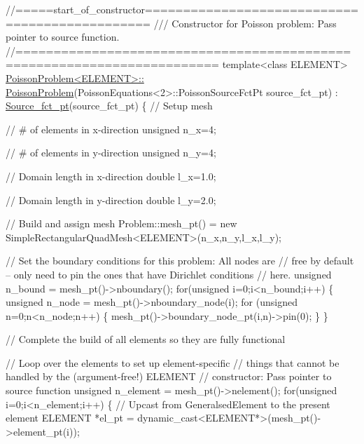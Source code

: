 \begin{DoxyCodeInclude}
\textcolor{comment}{//=====start\_of\_constructor===============================================}
\textcolor{comment}{/// Constructor for Poisson problem: Pass pointer to source function.}
\textcolor{comment}{}\textcolor{comment}{//========================================================================}
\textcolor{keyword}{template}<\textcolor{keyword}{class} ELEMENT>
\hyperlink{classPoissonProblem_a9c28346c473d246d8f61022365e742ea}{PoissonProblem<ELEMENT>::}
\hyperlink{classPoissonProblem_a9c28346c473d246d8f61022365e742ea}{      PoissonProblem}(PoissonEquations<2>::PoissonSourceFctPt source\_fct\_pt)
       :  \hyperlink{classPoissonProblem_a2ba5bb705abab012b72bbd7f4016d5fe}{Source\_fct\_pt}(source\_fct\_pt)
\{ 
 \textcolor{comment}{// Setup mesh}

 \textcolor{comment}{// # of elements in x-direction}
 \textcolor{keywordtype}{unsigned} n\_x=4;

 \textcolor{comment}{// # of elements in y-direction}
 \textcolor{keywordtype}{unsigned} n\_y=4;

 \textcolor{comment}{// Domain length in x-direction}
 \textcolor{keywordtype}{double} l\_x=1.0;

 \textcolor{comment}{// Domain length in y-direction}
 \textcolor{keywordtype}{double} l\_y=2.0;

 \textcolor{comment}{// Build and assign mesh}
 Problem::mesh\_pt() = \textcolor{keyword}{new} SimpleRectangularQuadMesh<ELEMENT>(n\_x,n\_y,l\_x,l\_y);

 \textcolor{comment}{// Set the boundary conditions for this problem: All nodes are}
 \textcolor{comment}{// free by default -- only need to pin the ones that have Dirichlet conditions}
 \textcolor{comment}{// here. }
 \textcolor{keywordtype}{unsigned} n\_bound = mesh\_pt()->nboundary();
 \textcolor{keywordflow}{for}(\textcolor{keywordtype}{unsigned} i=0;i<n\_bound;i++)
  \{
   \textcolor{keywordtype}{unsigned} n\_node = mesh\_pt()->nboundary\_node(i);
   \textcolor{keywordflow}{for} (\textcolor{keywordtype}{unsigned} n=0;n<n\_node;n++)
    \{
     mesh\_pt()->boundary\_node\_pt(i,n)->pin(0); 
    \}
  \}

 \textcolor{comment}{// Complete the build of all elements so they are fully functional}

 \textcolor{comment}{// Loop over the elements to set up element-specific }
 \textcolor{comment}{// things that cannot be handled by the (argument-free!) ELEMENT }
 \textcolor{comment}{// constructor: Pass pointer to source function}
 \textcolor{keywordtype}{unsigned} n\_element = mesh\_pt()->nelement();
 \textcolor{keywordflow}{for}(\textcolor{keywordtype}{unsigned} i=0;i<n\_element;i++)
  \{
   \textcolor{comment}{// Upcast from GeneralsedElement to the present element}
   ELEMENT *el\_pt = \textcolor{keyword}{dynamic\_cast<}ELEMENT*\textcolor{keyword}{>}(mesh\_pt()->element\_pt(i));


\end{DoxyCodeInclude}
